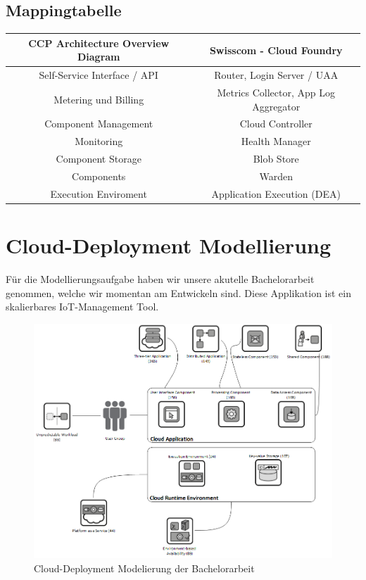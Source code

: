 \subsection{Mappingtabelle}
\begin{table}[H]
\begin{tabular}{|c|c|}
\hline 
\textbf{CCP Architecture Overview Diagram} & \textbf{Swisscom - Cloud Foundry} \\ 
\hline 
Self-Service Interface / API & Router, Login Server / UAA \\ 
\hline 
Metering und Billing & Metrics Collector, App Log Aggregator \\ 
\hline 
Component Management & Cloud Controller \\ 
\hline 
Monitoring & Health Manager \\ 
\hline 
Component Storage & Blob Store \\ 
\hline 
Components & Warden \\ 
\hline 
Execution Enviroment & Application Execution (DEA) \\ 
\hline 
\end{tabular} 
\end{table}

\section{Cloud-Deployment Modellierung}
Für die Modellierungsaufgabe haben wir unsere akutelle Bachelorarbeit genommen, welche wir momentan am Entwickeln sind. Diese Applikation ist ein skalierbares IoT-Management Tool. %
\begin{figure}[H]
\centering
\includegraphics[scale=0.5]{images/ccp/iot_smartmanager_ccp}
\caption{Cloud-Deployment Modelierung der Bachelorarbeit}
\end{figure}
